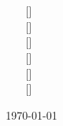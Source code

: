 \title{
	\Huge{\workSheet} \\
	\Large{\course}
}
\author{ %
	\textbf{\memberA} [\memberAMartricle]~\textit{\memberAMail} \\
	\textbf{\memberB} [\memberBMartricle]~\textit{\memberBMail} \\
	\textbf{\memberC} [\memberCMartricle]~\textit{\memberCMail} \\
	\textbf{\memberD} [\memberDMartricle]~\textit{\memberDMail} \\
	\textbf{\memberE} [\memberEMartricle]~\textit{\memberEMail} \\
	\textbf{\memberF} [\memberFMartricle]~\textit{\memberFMail} \\
}
\date{\today}

\pagestyle{fancy}
\fancyhf{}

\lhead{
	\semester \\
	\courseShort \\
	\workSheet
}
\chead{\group}
\cfoot{\thepage}


\usepackage[
	pdftitle={\semester~\course~\workSheet},
	pdfauthor={\memberA, \memberB, \memberC},
	pdfsubject={\course},
	pdfkeywords={\semester, \courseShort, \course, \group, \workSheet},
	unicode
]{hyperref}